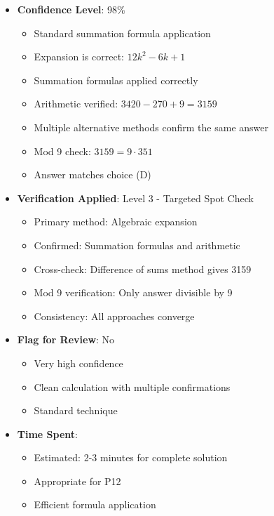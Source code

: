 \documentclass[12pt]{article}
\begin{document}
\begin{itemize}[leftmargin=*]
    \item \textbf{Confidence Level}: 98\% 
    \begin{itemize}
        \item Standard summation formula application
        \item Expansion is correct: $12k^2 - 6k + 1$
        \item Summation formulas applied correctly
        \item Arithmetic verified: $3420 - 270 + 9 = 3159$
        \item Multiple alternative methods confirm the same answer
        \item Mod 9 check: $3159 = 9 \cdot 351$ \checkmark
        \item Answer matches choice (D)
    \end{itemize}
    \item \textbf{Verification Applied}: Level 3 - Targeted Spot Check
    \begin{itemize}
        \item Primary method: Algebraic expansion
        \item Confirmed: Summation formulas and arithmetic
        \item Cross-check: Difference of sums method gives 3159
        \item Mod 9 verification: Only answer divisible by 9
        \item Consistency: All approaches converge
    \end{itemize}
    \item \textbf{Flag for Review}: No
    \begin{itemize}
        \item Very high confidence
        \item Clean calculation with multiple confirmations
        \item Standard technique
    \end{itemize}
    \item \textbf{Time Spent}: 
    \begin{itemize}
        \item Estimated: 2-3 minutes for complete solution
        \item Appropriate for P12
        \item Efficient formula application
    \end{itemize}
\end{itemize}
\end{document}

